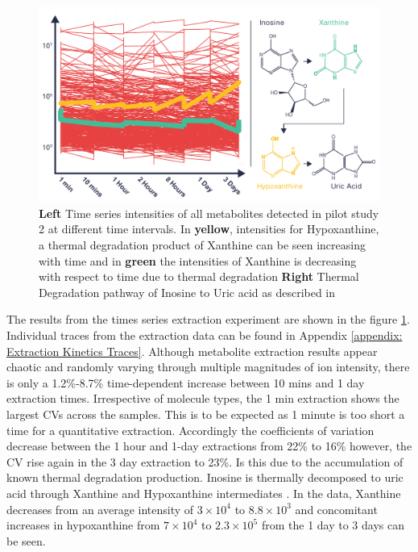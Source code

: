 \documentclass[a4paper,11pt,twoside]{book}
\begin{document}
	\begin{figure}[ht]
		\includegraphics[width=1.2\linewidth]{2.Optimizaiton_Figures/Extraction_Details.pdf}
		\caption{\textbf{Left} Time series intensities of all metabolites detected in pilot study 2 at different time intervals. In \textbf{yellow}, intensities for Hypoxanthine, a thermal degradation product of Xanthine can be seen increasing with time and in \textbf{green} the intensities of Xanthine is decreasing with respect to time due to thermal degradation  \textbf{Right} Thermal Degradation pathway of Inosine to Uric acid as described in \citep{FangThermalInvestigation}  }
		\label{fig:Pilot Study 2 - Extraction Time Series}
	\end{figure}
	
	The results from the times series extraction experiment are shown in the figure \ref{fig:Pilot Study 2 - Extraction Time Series}. Individual traces from the extraction data can be found in Appendix \ref{appendix: Extraction Kinetics Traces}. Although metabolite extraction results appear chaotic and randomly varying through multiple magnitudes of ion intensity, there is only a 1.2\%-8.7\% time-dependent increase between 10 mins and 1 day extraction times. Irrespective of molecule types, the 1 min extraction shows the largest CVs across the samples. This is to be expected as 1 minute is too short a time for a quantitative extraction. Accordingly the coefficients of variation decrease between the 1 hour and 1-day extractions from 22\% to 16\% however, the CV rise again in the 3 day extraction to 23\%. Is this due to the accumulation of known thermal degradation production. Inosine is thermally decomposed to uric acid through Xanthine and Hypoxanthine intermediates \citep{FangThermalInvestigation}. In the data, Xanthine decreases from an average intensity of $3\times10^4$ to $8.8\times10^3$ and concomitant increases in hypoxanthine from $7\times10^4$ to $2.3\times10^5$ from the 1 day to 3 days can be seen.
	
\end{document}
